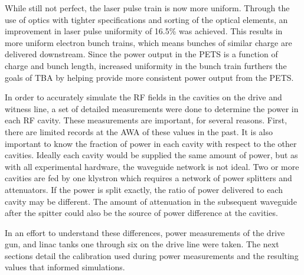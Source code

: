 While still not perfect, the laser pulse train is now more uniform.
Through the use of optics with tighter specifications and sorting of the optical elements, 
an improvement in laser pulse uniformity of 16.5\% was achieved.
This results in more uniform electron bunch trains, which means bunches 
of similar charge are delivered downstream. 
Since the power output in the PETS is a function of charge and bunch length, 
increased uniformity in the bunch train furthers the goals of TBA 
by helping provide more consistent power output from the PETS.


In order to accurately simulate the RF fields in the cavities on the drive and witness line, 
a set of detailed measurements were done to determine the power in each RF cavity.
These measurements are important, for several reasons. 
First, there are limited records at the AWA of these values in the past.
It is also important to know the fraction of power in each cavity 
with respect to the other cavities.
Ideally each cavity would be supplied the same amount of power, 
but as with all experimental hardware, the waveguide network is not ideal.
Two or more cavities are fed by one klystron which requires a network of 
power splitters and attenuators. If the power is split exactly, the ratio 
of power delivered to each cavity may be different. 
The amount of attenuation in the subsequent waveguide after the spitter could
also be the source of power difference at the cavities.
 
In an effort to understand these differences, 
power measurements of the drive gun, and linac tanks 
one through six on the drive line were taken.
The next sections detail the calibration used during power measurements and the 
resulting values that informed simulations. 

